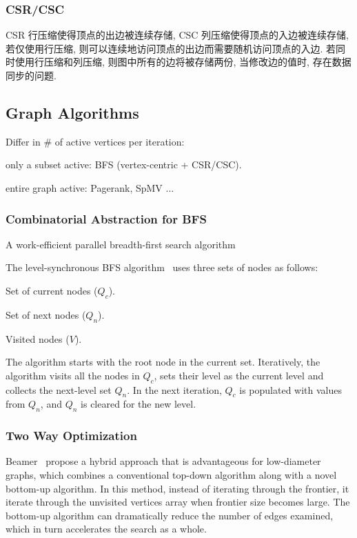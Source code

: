 \documentclass[UTF8,12pt,a4paper]{article}
\begin{document}
\subsubsection{CSR/CSC}
CSR 行压缩使得顶点的出边被连续存储, CSC 列压缩使得顶点的入边被连续存储,
若仅使用行压缩, 则可以连续地访问顶点的出边而需要随机访问顶点的入边.
若同时使用行压缩和列压缩, 则图中所有的边将被存储两份,
当修改边的值时, 存在数据同步的问题.

\subsection{Graph Algorithms}
Differ in \# of active vertices per iteration:
\begin{compactitem}
  \item only a subset active: BFS (vertex-centric + CSR/CSC).
  \item entire graph active: Pagerank, SpMV ...
\end{compactitem}
\subsubsection{Combinatorial Abstraction for BFS}
A work-efficient parallel breadth-first search algorithm
~\cite{DBLP:conf/spaa/LeisersonS10}

The level-synchronous BFS algorithm~\cite{DBLP:conf/ipps/AttiaJTJZ14}
uses three sets of nodes as follows:
\begin{compactitem}
  \item Set of current nodes ($Q_c$).
  \item Set of next nodes ($Q_n$).
  \item Visited nodes ($V$).
\end{compactitem}

The algorithm starts with the root node in the current set.
Iteratively, the algorithm visits all the nodes in $Q_c$,
sets their level as the current level
and collects the next-level set $Q_n$.
In the next iteration, $Q_c$ is populated with values from $Q_n$,
and $Q_n$ is cleared for the new level.
\subsubsection{Two Way Optimization}
Beamer~\cite{DBLP:conf/sc/BeamerAP12} propose a hybrid approach
that is advantageous for low-diameter graphs,
which combines a conventional top-down algorithm
along with a novel bottom-up algorithm.
In this method, instead of iterating through the frontier,
it iterate through the unvisited vertices array when frontier size becomes large.
The bottom-up algorithm can dramatically reduce the number of edges examined,
which in turn accelerates the search as a whole.
\end{document}
